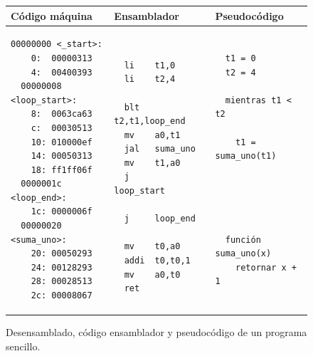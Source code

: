 \vspace{+0.4cm}
\begin{figure}[H]
\centering
\renewcommand{\arraystretch}{1}

\begin{tabular}{|p{}|p{}|p{}|}
\hline

\textbf{Código máquina} &
\textbf{Ensamblador} &
\textbf{Pseudocódigo} \\
\hline

\begin{lstlisting}[style=RiscVStyle]
  00000000 <_start>:
    0:  00000313
    4:  00400393
  00000008 <loop_start>:
    8:  0063ca63
    c:  00030513
    10: 010000ef
    14: 00050313
    18: ff1ff06f
  0000001c <loop_end>:
    1c: 0000006f
  00000020 <suma_uno>:
    20: 00050293
    24: 00128293
    28: 00028513
    2c: 00008067
\end{lstlisting}

&

\begin{lstlisting}[style=RiscVStyle]
  
  li    t1,0
  li    t2,4

  blt   t2,t1,loop_end
  mv    a0,t1
  jal   suma_uno
  mv    t1,a0
  j     loop_start

  j     loop_end

  mv    t0,a0
  addi  t0,t0,1
  mv    a0,t0
  ret
\end{lstlisting}

&

\begin{lstlisting}[style=RiscVStyle]
  
  t1 = 0
  t2 = 4
  
  mientras t1 < t2
  
    t1 = suma_uno(t1)



  
  
  función suma_uno(x)
    retornar x + 1
  
\end{lstlisting}

\\
\hline
\end{tabular}
\vspace{-0.2cm}
\caption{Desensamblado, código ensamblador y pseudocódigo de un programa sencillo.}
\end{figure}

